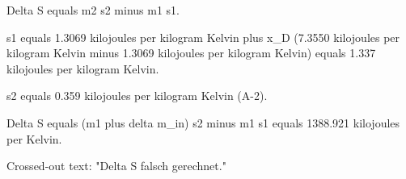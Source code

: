 Delta S equals m2 s2 minus m1 s1.  

s1 equals 1.3069 kilojoules per kilogram Kelvin plus x_D (7.3550 kilojoules per kilogram Kelvin minus 1.3069 kilojoules per kilogram Kelvin) equals 1.337 kilojoules per kilogram Kelvin.  

s2 equals 0.359 kilojoules per kilogram Kelvin (A-2).  

Delta S equals (m1 plus delta m_in) s2 minus m1 s1 equals 1388.921 kilojoules per Kelvin.  

Crossed-out text: "Delta S falsch gerechnet."